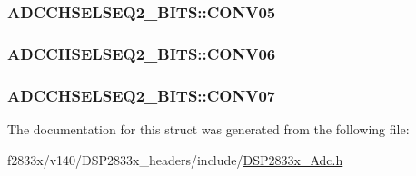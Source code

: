 \subsubsection[{C\+O\+N\+V05}]{ A\+D\+C\+C\+H\+S\+E\+L\+S\+E\+Q2\+\_\+\+B\+I\+T\+S\+::\+C\+O\+N\+V05}\label{struct_a_d_c_c_h_s_e_l_s_e_q2___b_i_t_s_a43fba800b490348dcf8a298f46e7af35}
\hypertarget{struct_a_d_c_c_h_s_e_l_s_e_q2___b_i_t_s_a9e0c7789e500bae02ea09aa7a5765a99}{}
\subsubsection[{C\+O\+N\+V06}]{ A\+D\+C\+C\+H\+S\+E\+L\+S\+E\+Q2\+\_\+\+B\+I\+T\+S\+::\+C\+O\+N\+V06}\label{struct_a_d_c_c_h_s_e_l_s_e_q2___b_i_t_s_a9e0c7789e500bae02ea09aa7a5765a99}
\hypertarget{struct_a_d_c_c_h_s_e_l_s_e_q2___b_i_t_s_a26a6645ce13192c8fddcf873acdfc398}{}
\subsubsection[{C\+O\+N\+V07}]{ A\+D\+C\+C\+H\+S\+E\+L\+S\+E\+Q2\+\_\+\+B\+I\+T\+S\+::\+C\+O\+N\+V07}\label{struct_a_d_c_c_h_s_e_l_s_e_q2___b_i_t_s_a26a6645ce13192c8fddcf873acdfc398}


The documentation for this struct was generated from the following file\+:\begin{DoxyCompactItemize}
\item 
f2833x/v140/\+D\+S\+P2833x\+\_\+headers/include/\hyperlink{_d_s_p2833x___adc_8h}{D\+S\+P2833x\+\_\+\+Adc.\+h}\end{DoxyCompactItemize}
